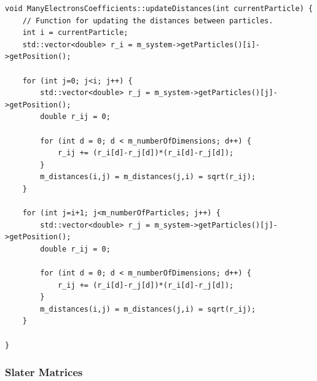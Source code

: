 \documentclass[../main.tex]{subfiles}
\begin{document}
\lstset{language=c++}
\begin{lstlisting}[caption={Function for updating the relative distances between particles whenever a particle is moved. $i$ is the moved particle so only the matrix elements where one of the indices is $i$ are changed when particle $i$ moves. Since no particle has any distance to itself, we split the loop in two so that we can exclude the $j=i$ case without using an if-test. Since the matrix is symmetric, $r_{ij} = r_{ji}$, and thus we can halve the number of distance calculations.}]
void ManyElectronsCoefficients::updateDistances(int currentParticle) {
    // Function for updating the distances between particles.
    int i = currentParticle;
    std::vector<double> r_i = m_system->getParticles()[i]->getPosition();

    for (int j=0; j<i; j++) {
        std::vector<double> r_j = m_system->getParticles()[j]->getPosition();
        double r_ij = 0;

        for (int d = 0; d < m_numberOfDimensions; d++) {
            r_ij += (r_i[d]-r_j[d])*(r_i[d]-r_j[d]);
        }
        m_distances(i,j) = m_distances(j,i) = sqrt(r_ij);
    }

    for (int j=i+1; j<m_numberOfParticles; j++) {
        std::vector<double> r_j = m_system->getParticles()[j]->getPosition();
        double r_ij = 0;

        for (int d = 0; d < m_numberOfDimensions; d++) {
            r_ij += (r_i[d]-r_j[d])*(r_i[d]-r_j[d]);
        }
        m_distances(i,j) = m_distances(j,i) = sqrt(r_ij);
    }
    
}
\end{lstlisting}

\subsubsection{Slater Matrices}
\end{document}
